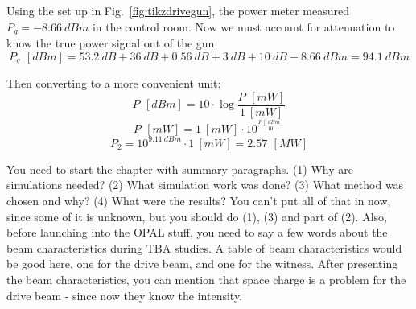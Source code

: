 \documentclass{iitthesis}
\newcommand{\lsnote}[1]{\textsf{{\color{violet}{ LS note:}   #1 }}}
\begin{document}
Using the set up in Fig.~\ref{fig:tikzdrivegun}, the power meter measured  $P_{g} = \SI{-8.66}{dBm}$
in the control room. Now we must account for attenuation to know the true power
signal out of the gun. 
\begin{equation}
P_g \, \SI{}{[dBm]} = \SI{53.2}{dB} + \SI{36}{dB} + \SI{0.56}{dB} + \SI{3}{dB}+\SI{10}{dB} - \SI{8.66}{dBm} = \SI{94.1}{dBm}
\end{equation}

Then converting to a more convenient unit: 
\begin{equation}
P \, \SI{}{[dBm]} = 10 \cdot \log{\frac{P \, \SI{}{[mW]}}{\SI{1}{[mW]}}}
\end{equation}
\begin{equation} \label{eq:dbmtomw}
P \, \SI{}{[mW]} = \SI{1}{[mW]} \cdot 10^{\frac{P \, [\SI{}{dBm}]}{\SI{10}{}}}
\end{equation}
\begin{equation} 
P_2 = 10^{\SI{9.11}{dBm}} \cdot  \SI{1}{[mW]} = 2.57 \, \SI{}{[MW]} 
\end{equation}


\label{sec:code}

\lsnote{You need to start the chapter with summary paragraphs.  (1) Why are simulations needed?  (2) What simulation work was done?  (3) What method was chosen and why?  (4) What were the results?  You can't put  all of that in now, since some of it is unknown, but you should do (1), (3) and part of (2).  Also, before launching into the OPAL stuff, you need to say a few words about the beam characteristics during TBA studies.  A table of beam characteristics would be good here, one for the drive beam, and one for the witness.  After presenting the beam characteristics, you can mention that space charge is a problem for the drive beam - since now they know the intensity.}
\end{document}
